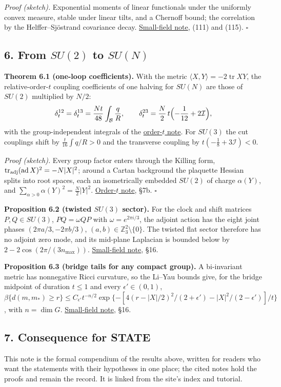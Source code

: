 \documentclass[11pt,a4paper]{article}
\begin{document}
\emph{Proof (sketch).} Exponential moments of linear functionals under
the uniformly convex measure, stable under linear tilts, and a Chernoff
bound; the correlation by the Helffer--Sjöstrand covariance decay.
\href{su2-midplane-small-field.md}{Small-field note}, (111) and (115).
\(\square\)

\hypertarget{from-su2-to-sun}{%
\subsection{\texorpdfstring{6. From \(SU(2)\) to
\(SU(N)\)}{6. From SU(2) to SU(N)}}\label{from-su2-to-sun}}

\textbf{Theorem 6.1 (one-loop coefficients).} With the metric
\(\langle X,Y\rangle=-2\operatorname{tr}XY\), the relative-order-\(t\)
coupling coefficients of one halving for \(SU(N)\) are those of
\(SU(2)\) multiplied by \(N/2\):
\[\delta_t^{12}=\delta_t^{13}=\frac{Nt}{48}\int_{\mathcal B}\frac qR,\qquad
\delta_t^{23}=\frac N2\,t\Bigl(-\frac1{12}+2\mathcal I\Bigr),\] with the
group-independent integrals of the
\href{su2-midplane-order-t.md}{order-\(t\) note}. For \(SU(3)\) the cut
couplings shift by \(\frac t{16}\int q/R>0\) and the transverse coupling
by \(t(-\frac18+3\mathcal I)<0\).

\emph{Proof (sketch).} Every group factor enters through the Killing
form, \(\operatorname{tr}_{\rm adj}(\operatorname{ad}X)^2=-N|X|^2\);
around a Cartan background the plaquette Hessian splits into root
spaces, each an isometrically embedded \(SU(2)\) of charge
\(\alpha(Y)\), and \(\sum_{\alpha>0}\alpha(Y)^2=\frac N2|Y|^2\).
\href{su2-midplane-order-t.md}{Order-\(t\) note}, §7b. \(\square\)

\textbf{Proposition 6.2 (twisted \(SU(3)\) sector).} For the clock and
shift matrices \(P,Q\in SU(3)\), \(PQ=\omega QP\) with
\(\omega=e^{2\pi i/3}\), the adjoint action has the eight joint phases
\((2\pi a/3,-2\pi b/3)\), \((a,b)\in\mathbb Z_3^2\setminus\{0\}\). The
twisted flat sector therefore has no adjoint zero mode, and its
mid-plane Laplacian is bounded below by \(2-2\cos(2\pi/(3n_{\max}))\).
\href{su2-midplane-small-field.md}{Small-field note}, §16.

\textbf{Proposition 6.3 (bridge tails for any compact group).} A
bi-invariant metric has nonnegative Ricci curvature, so the Li--Yau
bounds give, for the bridge midpoint of duration \(t\le1\) and every
\(\epsilon'\in(0,1)\),
\(\beta\{d(m,m_*)\ge r\}\le C_{\epsilon'}t^{-n/2}\exp\{-[4(r-|X|/2)^2/(2+\epsilon')-|X|^2/(2-\epsilon')]/t\}\),
with \(n=\dim G\). \href{su2-midplane-small-field.md}{Small-field note},
§16.

\hypertarget{consequence-for-state}{%
\subsection{7. Consequence for STATE}\label{consequence-for-state}}

This note is the formal compendium of the results above, written for
readers who want the statements with their hypotheses in one place; the
cited notes hold the proofs and remain the record. It is linked from the
site's index and tutorial.
\end{document}
